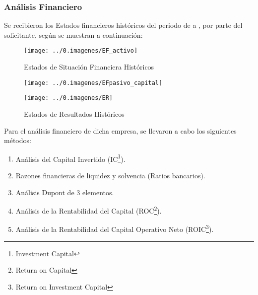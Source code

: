 \subsubsection{An\'alisis Financiero}

Se recibieron los Estados financieros hist\'oricos del periodo de \EFde{}  a \EFhasta, por parte del  solicitante, seg\'un se muestran a continuaci\'on:

\begin{figure}[H]
\centering
\caption{Estados de Situaci\'on Financiera Hist\'oricos \EFdeHasta \label{fig:ESF}}\vspace{10pt}
\texttt{[image: ../0.imagenes/EF\_activo]}\\[5pt]

\end{figure}

\begin{figure}[H]
\centering
\texttt{[image: ../0.imagenes/EFpasivo\_capital]}\\

\end{figure}

\begin{figure}[H]
\centering
\caption{Estados de Resultados Hist\'oricos \EFdeHasta \label{fig:ESF}}\vspace{10pt}
\texttt{[image: ../0.imagenes/ER]}\\
\end{figure}


Para el an\'alisis financiero de dicha empresa, se llevaron a cabo los siguientes m\'etodos:
\begin{enumerate}
\item An\'alisis del Capital Invertido (IC\footnote{Investment Capital}).
\item Razones financieras de liquidez y solvencia (Ratios bancarios).
\item An\'alisis Dupont de 3 elementos.
\item An\'alisis de la Rentabilidad del Capital (ROC\footnote{Return on Capital}).
\item An\'alisis de la Rentabilidad del Capital Operativo Neto (ROIC\footnote{Return on Investment Capital}).
\end{enumerate}


